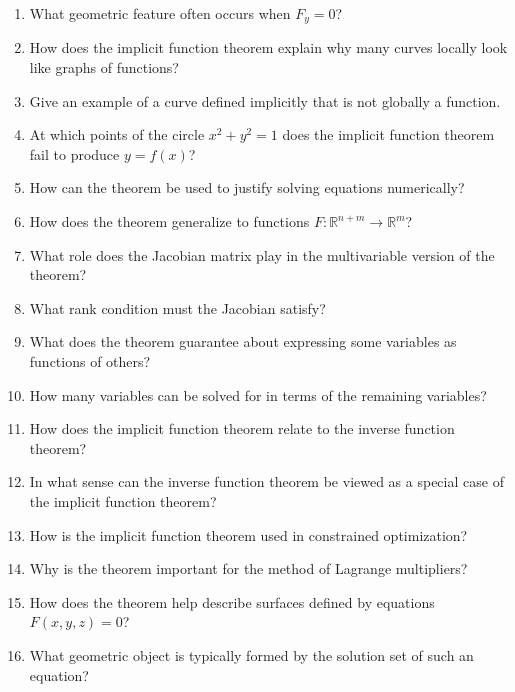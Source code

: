 \begin{enumerate}
\item What geometric feature often occurs when \(F_y=0\)?

\item How does the implicit function theorem explain why many curves locally look like graphs of functions?

\item Give an example of a curve defined implicitly that is not globally a function.

\item At which points of the circle \(x^2+y^2=1\) does the implicit function theorem fail to produce \(y=f(x)\)?

\item How can the theorem be used to justify solving equations numerically?

\item How does the theorem generalize to functions \(F:\mathbb{R}^{n+m} \to \mathbb{R}^m\)?

\item What role does the Jacobian matrix play in the multivariable version of the theorem?

\item What rank condition must the Jacobian satisfy?

\item What does the theorem guarantee about expressing some variables as functions of others?

\item How many variables can be solved for in terms of the remaining variables?

\item How does the implicit function theorem relate to the inverse function theorem?

\item In what sense can the inverse function theorem be viewed as a special case of the implicit function theorem?

\item How is the implicit function theorem used in constrained optimization?

\item Why is the theorem important for the method of Lagrange multipliers?

\item How does the theorem help describe surfaces defined by equations \(F(x,y,z)=0\)?

\item What geometric object is typically formed by the solution set of such an equation?


\end{enumerate}
